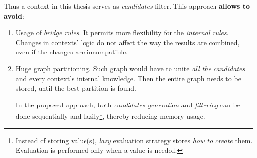 \documentclass[ThesisDoc]{subfiles}
\begin{document}
Thus a context in this thesis serves as \emph{candidates} filter. This approach
\textbf{allows to avoid}:
\begin{enumerate}
  \item Usage of \emph{bridge rules}. It permits more flexibility for
    the \emph{internal rules}. Changes in contexts' logic do not affect the way
    the results are combined, even if the changes are incompatible.
  \item Huge graph partitioning. Such graph would have to unite \emph{all the
    candidates} and every context's internal knowledge. Then the entire graph
    needs to be stored, until the best partition is found.

    In the proposed approach, both \emph{candidates generation} and
    \emph{filtering} can be done sequentially and
    lazily\footnote{Instead of storing value(s), \emph{lazy} evaluation
                    strategy stores \emph{how to create} them.
                    Evaluation is performed only when a value is needed.},
    thereby reducing memory usage.

\end{enumerate}
\end{document}
